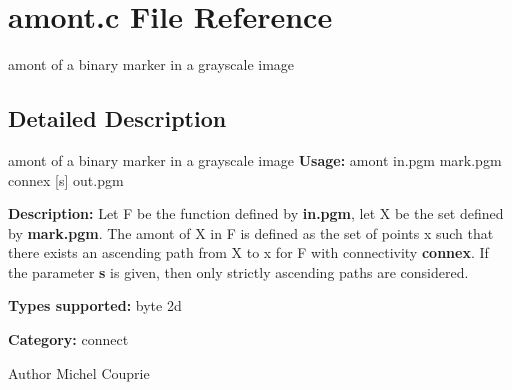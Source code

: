 \section{amont.c File Reference}
\label{amont_8c}


amont of a binary marker in a grayscale image  




\subsection{Detailed Description}
amont of a binary marker in a grayscale image {\bfseries Usage:} amont in.pgm mark.pgm connex [s] out.pgm

{\bfseries Description:} Let F be the function defined by {\bfseries in.pgm}, let X be the set defined by {\bfseries mark.pgm}. The amont of X in F is defined as the set of points x such that there exists an ascending path from X to x for F with connectivity {\bfseries connex}. If the parameter {\bfseries s} is given, then only strictly ascending paths are considered.

{\bfseries Types supported:} byte 2d

{\bfseries Category:} connect

\begin{DoxyAuthor}{Author}
Michel Couprie 
\end{DoxyAuthor}

